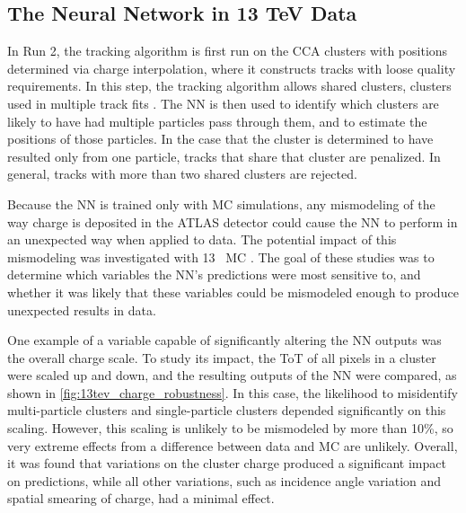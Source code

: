 \subsection{The Neural Network in 13 TeV Data}

In Run 2, the tracking algorithm is first run on the \ac{CCA} clusters with positions determined via charge interpolation, where it constructs tracks with loose quality requirements. In this step, the tracking algorithm allows shared clusters, clusters used in multiple track fits \cite{ATL-PHYS-PUB-2015-044}. The \ac{NN} is then used to identify which clusters are likely to have had multiple particles pass through them, and to estimate the positions of those particles. In the case that the cluster is determined to have resulted only from one particle, tracks that share that cluster are penalized. In general, tracks with more than two shared clusters are rejected.

Because the \ac{NN} is trained only with \ac{MC} simulations, any mismodeling of the way charge is deposited in the \ac{ATLAS} detector could cause the \ac{NN} to perform in an unexpected way when applied to data. The potential impact of this mismodeling was investigated with 13 \tev~\ac{MC} \cite{ATL-PHYS-PUB-2015-052}. The goal of these studies was to determine which variables the \ac{NN}'s predictions were most sensitive to, and whether it was likely that these variables could be mismodeled enough to produce unexpected results in data. 

One example of a variable capable of significantly altering the \ac{NN} outputs was the overall charge scale. To study its impact, the \ac{ToT} of all pixels in a cluster were scaled up and down, and the resulting outputs of the \ac{NN} were compared, as shown in \autoref{fig:13tev_charge_robustness}. In this case, the likelihood to misidentify multi-particle clusters and single-particle clusters depended significantly on this scaling. However, this scaling is unlikely to be mismodeled by more than 10\%, so very extreme effects from a difference between data and \ac{MC} are unlikely. Overall, it was found that variations on the cluster charge produced a significant impact on predictions, while all other variations, such as incidence angle variation and spatial smearing of charge, had a minimal effect. 


